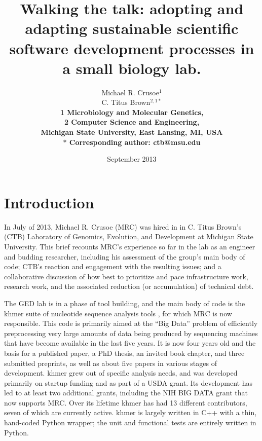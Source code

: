 \documentclass[11pt]{article}
\date{September 2013}
\title{Walking the talk: adopting and adapting sustainable scientific software
  development processes in a small biology lab.}
\author{Michael R. Crusoe$^{1}$\\
C. Titus Brown$^{2,1\ast}$\\
\small \bf{1} Microbiology and Molecular Genetics,\\
\small \bf{2} Computer Science and Engineering,\\
\small Michigan State University, East Lansing, MI, USA\\
\small $\ast$ Corresponding author: ctb@msu.edu}
\begin{document}
\maketitle


\setlength{\parindent}{0pt}
\setlength{\parindent}{0pt}
\setlength{\parskip}{0.70ex}

\section{Introduction}

In July of 2013, Michael R. Crusoe (MRC) was hired in in C. Titus Brown's (CTB)
Laboratory of Genomics, Evolution, and Development at Michigan State
University.  This brief recounts MRC's experience so far in the lab as an
engineer and budding researcher, including his assessment of the group's main
body of code; CTB's reaction and engagement with the resulting issues; and a
collaborative discussion of how best to prioritize and pace infrastructure
work, research work, and the associated reduction (or accumulation) of
technical debt.

The GED lab is in a phase of tool building, and the main body of code is the
khmer suite of nucleotide sequence analysis tools \cite{khmer}, for which MRC
is now responsible.  This code is primarily aimed at the ``Big Data'' problem
of efficiently preprocessing very large amounts of data being produced by
sequencing machines that have become available in the last five years.  It is
now four years old and the basis for a published paper, a PhD thesis, an
invited book chapter, and three submitted preprints, as well as about five
papers in various stages of development.  khmer grew out of specific analysis
needs, and was developed primarily on startup funding and as part of a USDA
grant.  Its development has led to at least two additional grants, including
the NIH BIG DATA grant that now supports MRC.  Over its lifetime khmer has had
13 different contributors, seven of which are currently active.  khmer is
largely written in C++ with a thin, hand-coded Python wrapper; the unit and
functional tests are entirely written in Python.
\end{document}
